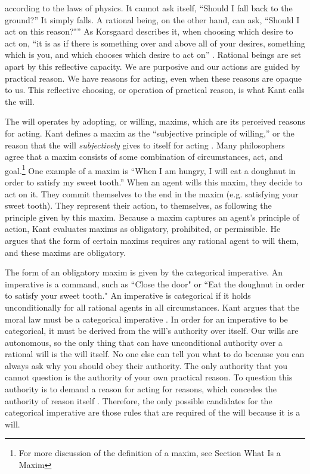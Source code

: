 \begin{isabellebody}
\begin{isamarkuptext}
according to the laws of physics. It cannot ask itself, ``Should I fall back to the ground?'' 
It simply falls. A rational being, on the other hand, can ask, ``Should I act on this reason?"''
As Korsgaard describes it, when choosing which desire to act on, ``it is as if there is something over 
and above all of your desires, something which is you, and which chooses which desire to act on'' \citep[100]{sources}. 
Rational beings are set apart by this reflective capacity. We are purposive and 
our actions are guided by practical reason. We have reasons for acting, even when these reasons are
opaque to us. This reflective choosing, or operation of practical reason, is what Kant calls the will. 

The will operates by adopting, or willing, maxims, which are its perceived reasons for acting. Kant defines a maxim as 
the ``subjective principle of willing,'' or the reason that the will \emph{subjectively} gives 
to itself for acting \citep[16 footnote 1]{groundwork}. Many philosophers agree that a maxim consists 
of some combination of circumstances, 
act, and goal.\footnote{For more discussion of the definition of a maxim, see Section What Is a Maxim}
One example of a maxim is ``When I am hungry, I will eat a doughnut in order to satisfy my sweet tooth.''
When an agent wills this maxim, they decide to act on it. They commit themselves to the end in the maxim 
(e.g. satisfying your sweet tooth). They represent their action, to themselves, as following the 
principle given by this maxim. Because a maxim captures an agent's principle of action, Kant evaluates
maxims as obligatory, prohibited, or permissible. He argues that the form of certain maxims 
requires any rational agent to will them, and these maxims are obligatory. 

The form of an obligatory maxim is given by the categorical imperative. 
An imperative is a command, such as ``Close the door" or ``Eat the doughnut in order to satisfy your 
sweet tooth." An imperative is categorical if it holds unconditionally for all rational agents in all 
circumstances. Kant argues that the moral law must be a categorical imperative \citep[5]{groundwork}. 
In order for an imperative to be categorical, it must be derived from the will's authority over itself. 
Our wills are autonomous, so the only thing that can have unconditional authority over a rational will is 
the will itself. No one else can tell you what to do because you can always ask why you 
should obey their authority. The only authority that you cannot question is the authority of your own 
practical reason. To question this authority is to demand a reason for acting for reasons, which 
concedes the authority of reason itself \citep[23]{velleman}. Therefore, the only possible candidates 
for the categorical imperative are those rules that are required of the will because it is a will. 


\end{isamarkuptext}
\end{isabellebody}
